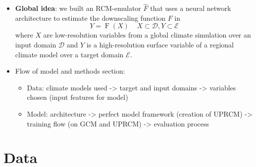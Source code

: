 \documentclass[a4paper,11pt,oneside]{report}
\begin{document}
\begin{itemize}
\item \textbf{Global idea}: we built an RCM-emulator $\hat{F}$ that uses a neural network architecture to estimate the downscaling function $F$ in 
\begin{equation}\label{eq:emulator-equation}
    Y = \operatorname{F}(X) \;\;\;\; X\subset\mathcal{D}, Y\subset\mathcal{E}
    \end{equation}
where $X$ are low-resolution variables from a global climate simulation over an input domain $\mathcal{D}$ and $Y$ is a high-resolution surface variable of a regional climate model over a target domain $\mathcal{E}$. 
\item Flow of model and methods section: 
\begin{itemize}
    \item Data: climate models used -> target and input domains -> variables chosen (input features for model)
    \item Model: architecture -> perfect model framework (creation of UPRCM) -> training flow (on GCM and UPRCM) -> evaluation process
\end{itemize}
\end{itemize}

\section{Data}\label{sec:data}
\end{document}
